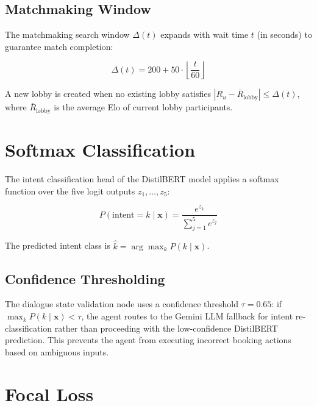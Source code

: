 \subsection{Matchmaking Window}

The matchmaking search window $\Delta(t)$ expands with wait time $t$ (in seconds)
to guarantee match completion:

\begin{equation}
  \Delta(t) = 200 + 50 \cdot \left\lfloor \frac{t}{60} \right\rfloor
  \label{eq:elo-window}
\end{equation}

A new lobby is created when no existing lobby satisfies
$|R_u - \bar{R}_{\text{lobby}}| \leq \Delta(t)$, where $\bar{R}_{\text{lobby}}$
is the average Elo of current lobby participants.

\section{Softmax Classification}
\label{app:math-softmax}

The intent classification head of the DistilBERT model applies a softmax function
over the five logit outputs $z_1, \ldots, z_5$:

\begin{equation}
  P(\text{intent} = k \mid \mathbf{x}) = \frac{e^{z_k}}{\sum_{j=1}^{5} e^{z_j}}
  \label{eq:softmax}
\end{equation}

\noindent The predicted intent class is $\hat{k} = \arg\max_k P(k \mid \mathbf{x})$.

\subsection{Confidence Thresholding}

The dialogue state validation node uses a confidence threshold $\tau = 0.65$:
if $\max_k P(k \mid \mathbf{x}) < \tau$, the agent routes to the Gemini LLM fallback
for intent re-classification rather than proceeding with the low-confidence
DistilBERT prediction.  This prevents the agent from executing incorrect booking
actions based on ambiguous inputs.

\section{Focal Loss}
\label{app:math-focal}

